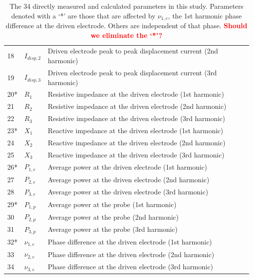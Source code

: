\documentclass[12pt]{iopart}
\begin{document}
\begin{table}[]
\begin{tabular}{|p{1cm}|p{2cm}|p{12.5cm}|}
        18 & $I_{disp,2}$ & Driven electrode peak to peak displacement current (2nd harmonic) \\
        19 & $I_{disp,3}$ & Driven electrode peak to peak displacement current (3rd harmonic) \\
        20* & $R_{1}$ & Resistive impedance at the driven electrode (1st harmonic) \\
        21 & $R_{2}$ & Resistive impedance at the driven electrode (2nd harmonic) \\
        22 & $R_{3}$ & Resistive impedance at the driven electrode (3rd harmonic) \\
        23* & $X_{1}$ & Reactive impedance at the driven electrode (1st harmonic) \\
        24 & $X_{2}$ & Reactive impedance at the driven electrode (2nd harmonic) \\
        25 & $X_{3}$ & Reactive impedance at the driven electrode (3rd harmonic) \\
        26* & $P_{1,e}$ & Average power at the driven electrode (1st harmonic) \\
        27 & $P_{2,e}$ & Average power at the driven electrode (2nd harmonic) \\      
        28 & $P_{3,e}$ & Average power at the driven electrode (3rd harmonic) \\
        29* & $P_{1,p}$ & Average power at the probe (1st harmonic) \\
        30 & $P_{2,p}$ & Average power at the probe (2nd harmonic) \\
        31 & $P_{3,p}$ & Average power at the probe (3rd harmonic) \\
        32* & $\nu_{1,e}$ & Phase difference at the driven electrode (1st harmonic) \\
        33 & $\nu_{2,e}$ & Phase difference at the driven electrode (2nd harmonic) \\
        34 & $\nu_{3,e}$ & Phase difference at the driven electrode (3rd harmonic) \\
\hline
    \end{tabular}
    \caption{The 34 directly measured and calculated parameters in this study.  Parameters denoted with a `*' are those that are affected by $\nu_{1,e}$, the 1st harmonic phase difference at the driven electrode.  Others are independent of that phase. \textcolor{red}{\textbf{Should we eliminate the `*'?}}}
    \label{tab:Measured_parameters}
\end{table}
\end{document}
